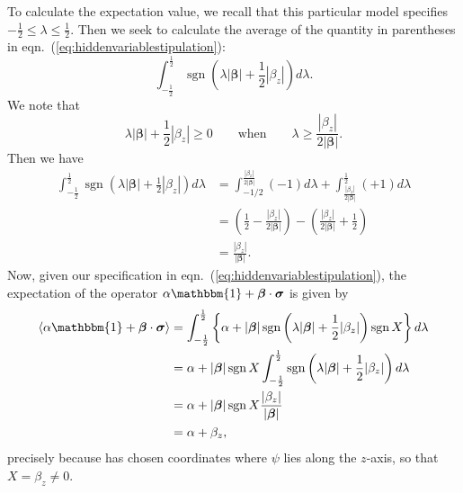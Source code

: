 \documentclass[12pt]{article}
\begin{document}
To calculate the expectation value, we recall that this particular model specifies $-\frac{1}{2} \le \lambda \le \frac{1}{2}$.  Then we seek to calculate the average of the quantity in parentheses in eqn.~(\ref{eq:hiddenvariablestipulation}):
\begin{displaymath}
  \int_{-\frac{1}{2}}^{\frac{1}{2}} \operatorname{sgn} \left( \lambda|\bm{\beta}| + \frac{1}{2} |\beta_z| \right) d\lambda.
\end{displaymath}
We note that
\begin{displaymath}
  \lambda|\bm{\beta}| + \frac{1}{2} |\beta_z| \ge 0 \qquad \text{when} \qquad \lambda \ge \frac{|\beta_z|}{2|\bm{\beta}|}.
\end{displaymath}
Then we have
\begin{displaymath}
  \begin{split}
    \int_{-\frac{1}{2}}^{\frac{1}{2}} \operatorname{sgn} \left( \lambda|\bm{\beta}| + \frac{1}{2} |\beta_z| \right) d\lambda
    &= \int_{-1/2}^{\frac{|\beta_z|}{2|\bm{\beta}|}} (-1) d\lambda + \int_{\frac{|\beta_z|}{2|\bm{\beta}|}}^{\frac{1}{2}} (+1) d\lambda \\
    &= \left( \frac{1}{2} - \frac{|\beta_z|}{2|\bm{\beta}|} \right) - \left( \frac{|\beta_z|}{2|\bm{\beta}|} + \frac{1}{2} \right) \\
    &= \frac{|\beta_z|}{|\bm{\beta}|}.
  \end{split}
\end{displaymath}
Now, given our specification in eqn.~(\ref{eq:hiddenvariablestipulation}), the expectation of the operator $\alpha \mathbbm{1} + \bm{\beta} \cdot \bm{\sigma}$ is given by
\begin{displaymath}
  \begin{split}
    \langle \alpha \mathbbm{1} + \bm{\beta} \cdot \bm{\sigma} \rangle
    &= \int_{-\frac{1}{2}}^{\frac{1}{2}} \left\{ \alpha + |\bm{\beta}| \operatorname{sgn} \left( \lambda|\bm{\beta}| + \frac{1}{2} |\beta_z| \right) \operatorname{sgn} X \right\} d\lambda \\
    &= \alpha + |\bm{\beta}| \operatorname{sgn} X \int_{-\frac{1}{2}}^{\frac{1}{2}} \operatorname{sgn} \left( \lambda|\bm{\beta}| + \frac{1}{2} |\beta_z| \right) d\lambda \\
    &= \alpha + |\bm{\beta}| \operatorname{sgn} X \frac{|\beta_z|}{|\bm{\beta}|} \\
    &= \alpha + \beta_z,
  \end{split}
\end{displaymath}
precisely because \cite{Bell1966} has chosen coordinates where $\psi$ lies along the $z$-axis, so that $X = \beta_z \not= 0$.
\end{document}
